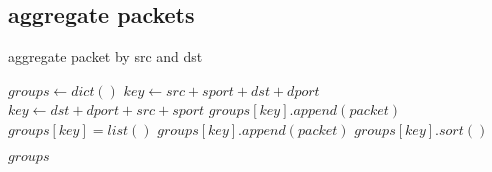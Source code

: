 \documentclass[preprint,12pt]{elsarticle}
\begin{document}
    \subsection{aggregate packets}
        \begin{algorithm}
            \caption{aggregate packet by src and dst}
            \begin{algorithmic}[1]
                    \State $ groups \gets dict() $
                            \State $ key \gets src + sport + dst + dport $
                        \Else
                            \State $ key \gets dst + dport + src + sport $
                        \EndIf
                            \State $ groups[key].append(packet) $
                        \Else
                            \State $ groups[key] = list() $
                            \State $ groups[key].append(packet) $
                        \EndIf
                     \EndFor
                        \State  $ groups[key].sort() $
                     \EndFor

                \State \Return $ groups $
                \EndFunction
            \end{algorithmic}
        \end{algorithm}
\end{document}
